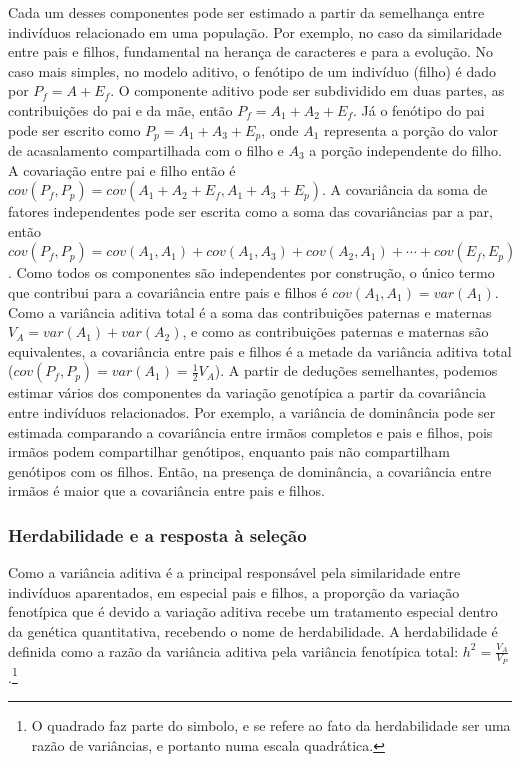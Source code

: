 \begin{refsection}
Cada um desses componentes pode ser estimado a partir da semelhança entre
indivíduos relacionado em uma população. Por exemplo, no caso da similaridade
entre pais e filhos, fundamental na herança de caracteres e para a evolução.
No caso mais simples, no modelo aditivo, o fenótipo de um indivíduo (filho) é dado por
$P_f = A + E_f$. O componente aditivo pode ser subdividido em duas partes, as
contribuições do pai e da mãe, então $P_f = A_1 + A_2 + E_f$. Já o fenótipo do pai
pode ser escrito como $P_p = A_1 + A_3 + E_p$, onde $A_1$ representa a porção
do valor de acasalamento compartilhada com o filho e $A_3$ a porção
independente do filho. A covariação entre pai e filho então é $cov(P_f, P_p) =
cov(A_1 + A_2 + E_f, A_1 + A_3 + E_p)$. A covariância da soma de fatores
independentes pode ser escrita como a soma das covariâncias par a par, então
$cov(P_f, P_p) = cov(A_1, A_1) + cov(A_1, A_3) + cov(A_2, A_1) + \cdots  +
cov(E_f, E_p)$. Como todos os componentes são independentes por construção, o
único termo que contribui para a covariância entre pais e filhos é $cov(A_1,
A_1) = var(A_1)$. Como a variância aditiva total é a soma das contribuições
paternas e maternas $V_A = var(A_1) + var(A_2)$, e como as contribuições
paternas e maternas são equivalentes, a covariância entre pais e filhos é a
metade da variância aditiva total ($cov(P_f, P_p) = var(A_1) = \frac{1}{2}V_A$).
A partir de deduções semelhantes, podemos estimar vários dos componentes da
variação genotípica a partir da covariância entre indivíduos relacionados. Por
exemplo, a variância de dominância pode ser estimada comparando a covariância
entre irmãos completos e pais e filhos, pois irmãos podem compartilhar
genótipos, enquanto pais não compartilham genótipos com os filhos. Então, na
presença de dominância, a covariância entre irmãos é maior que a covariância
entre pais e filhos.

\subsubsection{Herdabilidade e a resposta à seleção}

Como a variância aditiva é a principal responsável pela similaridade entre
indivíduos aparentados, em especial pais e filhos, a proporção da variação
fenotípica que é devido a variação aditiva recebe um tratamento especial
dentro da genética quantitativa, recebendo o nome de herdabilidade. A herdabilidade é
definida como a razão da variância aditiva pela variância fenotípica total: 
$h^2 = \frac{V_A}{V_P}$.\footnote{O quadrado faz parte do simbolo, e se refere
ao fato da herdabilidade ser uma razão de variâncias, e portanto numa escala
quadrática.} 


\end{refsection}
